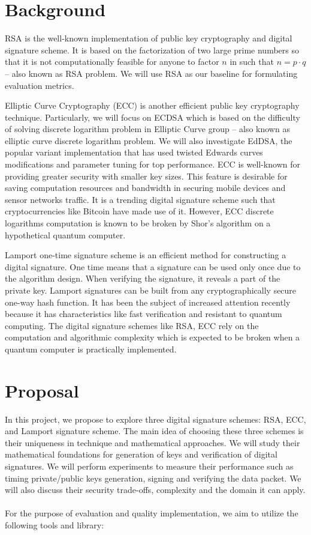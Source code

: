 \documentclass[11pt]{article} %
\begin{document}
\section{Background}

RSA\cite{Rivest:1978:MOD:359340.359342} is the well-known implementation of public key cryptography and digital signature scheme. It is based on the factorization of two large prime numbers so that it is not computationally feasible for anyone to factor $n$ in such that $n = p \cdot q$ -- also known as RSA problem. We will use RSA as our baseline for formulating evaluation metrics.

Elliptic Curve Cryptography (ECC) is another efficient public key cryptography technique. Particularly, we will focus on ECDSA\cite{Kerry13fipspub} which is based on the difficulty of solving discrete logarithm problem in Elliptic Curve group -- also known as elliptic curve discrete logarithm problem. We will also investigate EdDSA\cite{Bernstein2012}, the popular variant implementation that has used twisted Edwards curves modifications and parameter tuning for top performance. ECC is well-known for providing greater security with smaller key sizes. This feature is desirable for saving computation resources and bandwidth in securing mobile devices and sensor networks traffic. It is a trending digital signature scheme such that cryptocurrencies like Bitcoin have made use of it. However, ECC discrete logarithms computation is known to be broken by Shor's algorithm\cite{Shor:1997:PAP:264393.264406} on a hypothetical quantum computer.

Lamport one-time signature scheme\cite{lamport} is an efficient method for constructing a digital signature. One time means that a signature can be used only once due to the algorithm design. When verifying the signature, it reveals a part of the private key. Lamport signatures can be built from any cryptographically secure one-way hash function. It has been the subject of increased attention recently because it has characteristics like fast verification and resistant to quantum computing. The digital signature schemes like RSA, ECC rely on the computation and algorithmic complexity which is expected to be broken when a quantum computer is practically implemented.

\section{Proposal}

In this project, we propose to explore three digital signature schemes: RSA, ECC, and Lamport signature scheme. The main idea of choosing these three schemes is their uniqueness in technique and mathematical approaches. We will study their mathematical foundations for generation of keys and verification of digital signatures. We will perform experiments to measure their performance such as timing private/public keys generation, signing and verifying the data packet. We will also discuss their security trade-offs, complexity and the domain it can apply.
\\
\\
\noindent For the purpose of evaluation and quality implementation, we aim to utilize the following tools and library:
\end{document}
